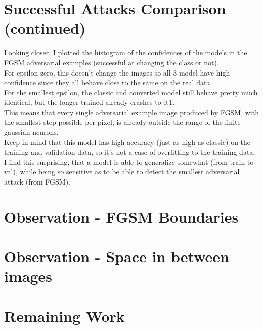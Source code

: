 \documentclass{article}
\begin{document}
\section{Successful Attacks Comparison (continued)}
Looking closer, I plotted the histogram of the confidences of the models in the FGSM adversarial examples (successful at changing the class or not). \\
For epsilon zero, this doesn't change the images so all 3 model have high confidence since they all behave close to the same on the real data.\\
For the smallest epsilon, the classic and converted model still behave pretty much identical, but the longer trained already crashes to 0.1.\\
This means that every single adversarial example image produced by FGSM, with the smallest step possible per pixel, is already outside the range of the finite gaussian neurons.\\
Keep in mind that this model has high accuracy (just as high as classic) on the training and validation data, so it's not a case of overfitting to the training data. I find this  surprising, that a model is able to generalize somewhat (from train to val), while being so sensitive as to be able to detect the smallest adversarial attack (from FGSM).\\

\section{Observation - FGSM Boundaries}
\section{Observation - Space in between images}

\section{Remaining Work}
\end{document}
